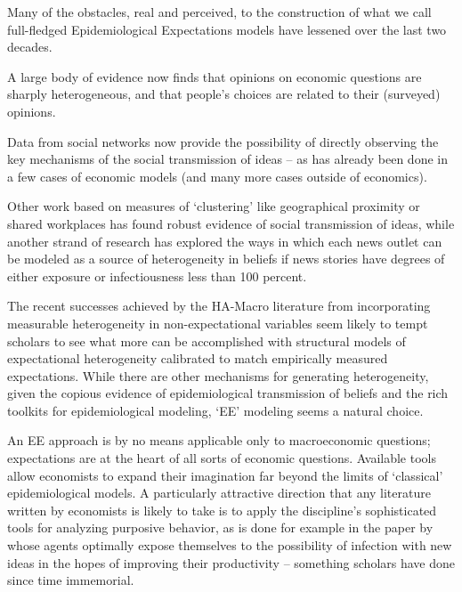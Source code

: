 \label{conclusion}

Many of the obstacles, real and perceived, to the construction of what we call full-fledged Epidemiological Expectations models have lessened over the last two decades.

A large body of evidence now finds that opinions on economic questions are sharply heterogeneous, and that people's choices are related to their (surveyed) opinions.

Data from social networks now provide the possibility of directly observing the key mechanisms of the social transmission of ideas -- as  has already been done in a few cases of economic models (and many more cases outside of economics).

Other work based on measures of `clustering' like geographical proximity or shared workplaces has found robust evidence of social transmission of ideas, while another strand of research has explored the ways in which each news outlet can be modeled as a source of heterogeneity in beliefs if news stories have degrees of either exposure or infectiousness less than 100 percent.

The recent successes achieved by the HA-Macro literature from incorporating  measurable  heterogeneity in non-expectational variables seem likely to tempt scholars to see what more can be accomplished with structural models of expectational heterogeneity calibrated to match empirically measured expectations.  While there are other mechanisms for generating heterogeneity, given the copious evidence of epidemiological transmission of beliefs and the rich toolkits for epidemiological modeling, `EE' modeling seems a natural choice.

An EE approach is by no means applicable only to macroeconomic questions; expectations are at the heart of all sorts of economic questions.  Available tools allow economists to expand their imagination far beyond the limits of  `classical' epidemiological models.  A particularly attractive direction that any literature written by economists is likely to take is to apply the discipline's sophisticated tools for analyzing purposive behavior, as is done for example in the paper by~\cite{lucas2014knowledge} whose agents optimally expose themselves to the possibility of infection with new ideas in the hopes of improving their productivity -- something scholars have done since time immemorial.


